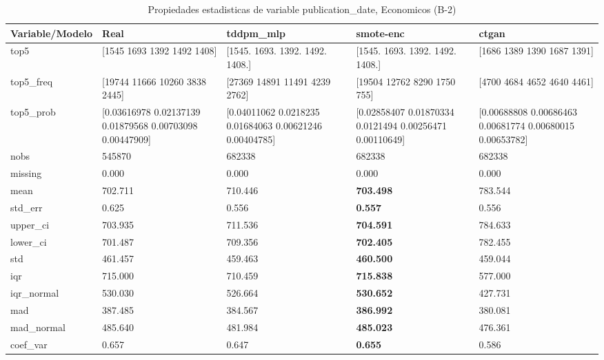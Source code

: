 \begin{table}[H]
\centering
\fontsize{8}{14}\selectfont
\caption{Propiedades  estadisticas de variable publication\_date, Economicos (B-2)}
\label{table-stats-economicos-b-2-publication_date}
\begin{tabular}{|l|m{10em}|m{10em}|m{10em}|m{10em}|}
\hline
 \rowcolor[gray]{0.8}
Variable/Modelo & Real & tddpm\_mlp & smote-enc & ctgan \\
\hline top5 & [1545 1693 1392 1492 1408] & [1545. 1693. 1392. 1492. 1408.] & [1545. 1693. 1392. 1492. 1408.] & [1686 1389 1390 1687 1391] \\
\hline top5\_freq & [19744 11666 10260  3838  2445] & [27369 14891 11491  4239  2762] & [19504 12762  8290  1750   755] & [4700 4684 4652 4640 4461] \\
\hline top5\_prob & [0.03616978 0.02137139 0.01879568 0.00703098 0.00447909] & [0.04011062 0.0218235  0.01684063 0.00621246 0.00404785] & [0.02858407 0.01870334 0.0121494  0.00256471 0.00110649] & [0.00688808 0.00686463 0.00681774 0.00680015 0.00653782] \\
\hline nobs & 545870 & 682338 & 682338 & 682338 \\
\hline missing & 0.000 & 0.000 & 0.000 & 0.000 \\
\hline mean & 702.711 & 710.446 & \bfseries 703.498 & \cellcolor[rgb]{0.9, 0.54, 0.52} 783.544 \\
\hline std\_err & 0.625 & 0.556 & \bfseries 0.557 & \cellcolor[rgb]{0.9, 0.54, 0.52} 0.556 \\
\hline upper\_ci & 703.935 & 711.536 & \bfseries 704.591 & \cellcolor[rgb]{0.9, 0.54, 0.52} 784.633 \\
\hline lower\_ci & 701.487 & 709.356 & \bfseries 702.405 & \cellcolor[rgb]{0.9, 0.54, 0.52} 782.455 \\
\hline std & 461.457 & 459.463 & \bfseries 460.500 & \cellcolor[rgb]{0.9, 0.54, 0.52} 459.044 \\
\hline iqr & 715.000 & 710.459 & \bfseries 715.838 & \cellcolor[rgb]{0.9, 0.54, 0.52} 577.000 \\
\hline iqr\_normal & 530.030 & 526.664 & \bfseries 530.652 & \cellcolor[rgb]{0.9, 0.54, 0.52} 427.731 \\
\hline mad & 387.485 & 384.567 & \bfseries 386.992 & \cellcolor[rgb]{0.9, 0.54, 0.52} 380.081 \\
\hline mad\_normal & 485.640 & 481.984 & \bfseries 485.023 & \cellcolor[rgb]{0.9, 0.54, 0.52} 476.361 \\
\hline coef\_var & 0.657 & 0.647 & \bfseries 0.655 & \cellcolor[rgb]{0.9, 0.54, 0.52} 0.586 \\

\end{tabular}
\end{table}
